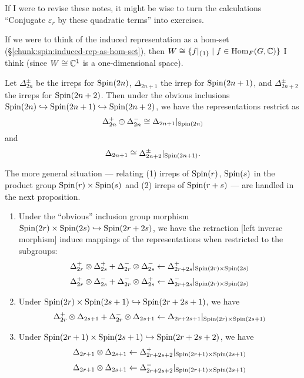 \begin{remark}
If I were to revise these notes, it might be wise to turn the
calculations ``Conjugate $\varepsilon_{r}$ by these quadratic terms''
into exercises.
\end{remark}

\begin{remark}
If we were to think of the induced representation as a hom-set (\S\ref{chunk:spin:induced-rep-as-hom-set}),
then $W\cong\{f|_{\{1\}}\mid f\in\operatorname{Hom}_{F}(G,\mathbb{C})\}$ I think (since
$W\cong\mathbb{C}^{1}$ is a one-dimensional space).
\end{remark}

\begin{proposition}
Let $\Delta^{\pm}_{2n}$ be the irreps for $\operatorname{Spin}(2n)$, $\Delta_{2n+1}$
the irrep for $\operatorname{Spin}(2n+1)$, and $\Delta^{\pm}_{2n+2}$ the irreps for
$\operatorname{Spin}(2n+2)$. Then under the obvious inclusions
$\operatorname{Spin}(2n)\hookrightarrow\operatorname{Spin}(2n+1)\hookrightarrow\operatorname{Spin}(2n+2)$, we have the representations
restrict as
\[ \Delta^{+}_{2n}\oplus\Delta^{-}_{2n} \cong \Delta_{2n+1}|_{\operatorname{Spin}(2n)} \]
and
\[ \Delta_{2n+1} \cong \Delta^{\pm}_{2n+2}|_{\operatorname{Spin}(2n+1)}. \]
\end{proposition}

The more general situation --- relating (1) irreps of $\operatorname{Spin}(r)$, $\operatorname{Spin}(s)$
in the product group $\operatorname{Spin}(r)\times\operatorname{Spin}(s)$ and (2) irreps of $\operatorname{Spin}(r+s)$
--- are handled in the next proposition.

\begin{proposition}
\begin{enumerate}
\item Under the ``obvious'' inclusion group morphism
  $\operatorname{Spin}(2r)\times\operatorname{Spin}(2s)\hookrightarrow\operatorname{Spin}(2r+2s)$, we have the retraction
  [left inverse morphism] induce mappings of the representations when
  restricted to the subgroups:
  \[ \Delta_{2r}^{+}\otimes\Delta_{2s}^{+} + \Delta^{-}_{2r}\otimes\Delta^{-}_{2s}
\gets \Delta_{2r+2s}^{+}|_{\operatorname{Spin}(2r)\times\operatorname{Spin}(2s)} \]
  \[ \Delta_{2r}^{+}\otimes\Delta_{2s}^{-} + \Delta^{-}_{2r}\otimes\Delta^{+}_{2s}
\gets \Delta_{2r+2s}^{-}|_{\operatorname{Spin}(2r)\times\operatorname{Spin}(2s)} \]
\item Under $\operatorname{Spin}(2r)\times\operatorname{Spin}(2s + 1)\hookrightarrow\operatorname{Spin}(2r+2s + 1)$, we have
  \[ \Delta_{2r}^{+}\otimes\Delta_{2s+1} + \Delta^{-}_{2r}\otimes\Delta_{2s+1}
\gets \Delta_{2r+2s+1}|_{\operatorname{Spin}(2r)\times\operatorname{Spin}(2s+1)} \]
\item Under $\operatorname{Spin}(2r+1)\times\operatorname{Spin}(2s+1)\hookrightarrow\operatorname{Spin}(2r+2s+2)$, we have
  \[ \Delta_{2r+1}\otimes\Delta_{2s+1}
\gets \Delta_{2r+2s+2}^{+}|_{\operatorname{Spin}(2r+1)\times\operatorname{Spin}(2s+1)} \]
  \[ \Delta_{2r+1}\otimes\Delta_{2s+1}
\gets \Delta_{2r+2s+2}^{-}|_{\operatorname{Spin}(2r+1)\times\operatorname{Spin}(2s+1)} \]
\end{enumerate}
\end{proposition}

